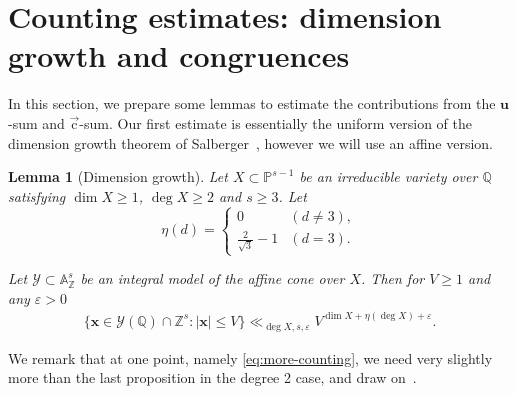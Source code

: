 \documentclass[letterpaper,11pt]{amsart}
\numberwithin{equation}{section}
\newtheorem{lemma}[theorem]{Lemma}
\theoremstyle{definition}
\numberwithin{equation}{section}
\newcommand{\PP}{\mathbb{P}}
\renewcommand{\AA}{\mathbb{A}}
\newcommand{\ZZ}{\mathbb{Z}}
\newcommand{\QQ}{\mathbb{Q}}
\newcommand{\x}{\mathbf{x}}
\newcommand{\uu}{\mathbf{u}}
\newcommand{\uc}{{\vec{\mathrm{c}}}}
\begin{document}
\section{Counting estimates: dimension growth and congruences}\label{sec:counting}
In this section, we prepare some lemmas to estimate the contributions from the $\uu$-sum and $\uc$-sum. Our first estimate is essentially the uniform version of the dimension growth theorem of Salberger~\cite[Theorem~0.3]{Sal}, however we will use an affine version. 
\begin{lemma}[Dimension growth]\label{dimgrowth}
	Let $X\subset \PP^{s-1}$ be an irreducible variety over $\QQ$ satisfying $\dim X\geq 1$, $\deg X \geq 2$ and $s\geq 3$. Let
 \[
\eta(d) =
\begin{cases}
    0&(d \neq 3),\\
    \frac{2}{\sqrt{3}}-1&(d=3).
\end{cases}
 \]
 
 Let \(\mathcal{Y}\subset \AA_\ZZ^{s}\) be an integral model of the affine cone over \(X\). Then for $V\geq 1$ and any $\varepsilon>0$
	\begin{align*}%
	\{\x \in \mathcal{Y}(\QQ)\cap\ZZ^{s}: |\x|\leq V \}\ll_{\deg X,s,\varepsilon} V^{\operatorname{dim}X+\eta(\deg X)+\varepsilon}.
	\end{align*}
\end{lemma}

We remark that at one point, namely \eqref{eq:more-counting}, we need very slightly more than the last proposition in the degree 2 case, and draw on~\cite[Lemma 3.7]{V19}.
\end{document}
